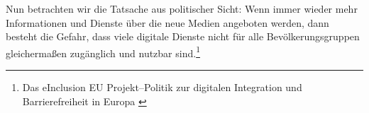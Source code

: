 Nun betrachten wir die Tatsache aus politischer Sicht: Wenn immer wieder mehr Informationen und Dienste über die neue Medien angeboten werden, dann besteht die Gefahr, dass viele digitale Dienste nicht für alle Bevölkerungsgruppen gleichermaßen zugänglich und nutzbar sind.\footnote{Das eInclusion EU Projekt--Politik zur digitalen Integration und Barrierefreiheit in Europa \cite{redingeinclusion}}